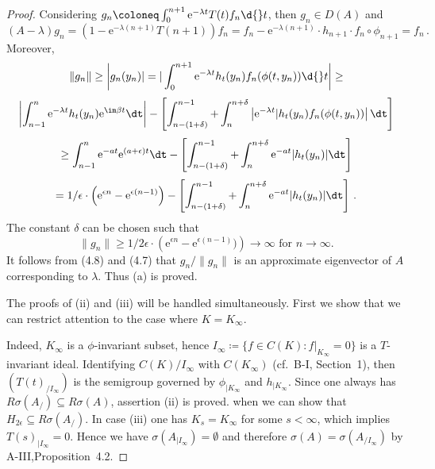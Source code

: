 \begin{proof}
	Considering $g_{n}\coloneq \int_{0}^{n+1} \mathrm{e}^{-\lambda t} T(t)f_{n} \d{}t$, then $g_{n} \in D(A)$ and
	\begin{equation}\label{eq:b3-4.7}
		(A - \lambda)g_{n} = (1 - \mathrm{e}^{-\lambda(n+1)}T(n+1))f_{n} = f_{n} - \mathrm{e}^{-\lambda(n+1)} \cdot h_{n+1} \cdot f_{n} \circ \phi_{n+1} = f_{n}\,.
	\end{equation}
	Moreover,
	\[\|g_{n}\| \geq \left|g_{n}(y_{n})| = |\int_{0}^{n+1} \mathrm{e}^{-\lambda t} h_{t}(y_{n})f_{n}(\phi(t,y_{n})) \d{}t\right| \geq\]
	\[\left|\int_{n-1}^{n} \mathrm{e}^{-\lambda t} h_{t}(y_{n}) \mathrm{e}^{\im\beta  t} \dt\right| - \left[\int_{n-(1+\delta)}^{n-1} + \int_{n}^{n+\delta}\left| \mathrm{e}^{-\lambda t}|h_{t}(y_{n})f_{n}(\phi(t,y_{n}))\right| \dt\right]\]
	\[\geq \int_{n-1}^{n} \mathrm{e}^{-at} \mathrm{e}^{(a+\epsilon)t} \dt - \left[\int_{n-(1+\delta)}^{n-1} + \int_{n}^{n+\delta} \mathrm{e}^{-at}|h_{t}(y_{n})| \dt\right]\]
	\[= 1/\epsilon \cdot\left(\mathrm{e}^{\epsilon n} - \mathrm{e}^{\epsilon(n-1)}\right) - \left[\int_{n-(1+\delta)}^{n-1} + \int_{n}^{n+\delta} \mathrm{e}^{-at}|h_{t}(y_{n})| \dt\right]\,.\]
	The constant $\delta$ can be chosen such that
	\begin{equation}\label{eq:b3-4.8}
		\|g_{n}\| \geq 1/2\epsilon \cdot\left(\mathrm{e}^{\epsilon n} - \mathrm{e}^{\epsilon(n-1)})\right) \to \infty \text{ for } n \to \infty.
	\end{equation}
	It follows from (4.8) and (4.7) that $ g_n / \|g_n\|$ is an approximate
	eigenvector of $A$ corresponding to $\lambda$. Thus (a) is proved. 
	
	The 
	proofs of (ii) and (iii) will be handled simultaneously. First we show that we can restrict attention to the case where $K = K_\infty$.
	
	
	Indeed, $K_{\infty}$ is a $\phi$-invariant subset, hence $I_{\infty}\coloneq \{f \in C(K) : f|_{K_{\infty}} = 0\}$ is a $T$-invariant ideal.
	Identifying $C(K)/I_{\infty}$ with $C(K_{\infty})$ (cf.\ B-I, Section~1), then $(T(t)_{/I_{\infty}})$ is the semigroup governed by $\phi_{|K_{\infty}}$ and $h_{|K_{\infty}}$.
	Since one always has $R{\sigma}(A_{/}) \subseteq R{\sigma}(A)$, assertion (ii) is proved.
%
%
	when we can show that $H_{2\epsilon} \subseteq R{\sigma}(A_{/})$.
	In case (iii) one has $K_{s} = K_{\infty}$ for some $s < \infty$, which implies $T(s)_{|I_{\infty}} = 0$.
	Hence we have $\sigma(A_{|I_{\infty}}) = \emptyset$ and therefore $\sigma(A) = \sigma(A_{/I_{\infty}})$ by A-III,Proposition~4.2.
	

\end{proof}
